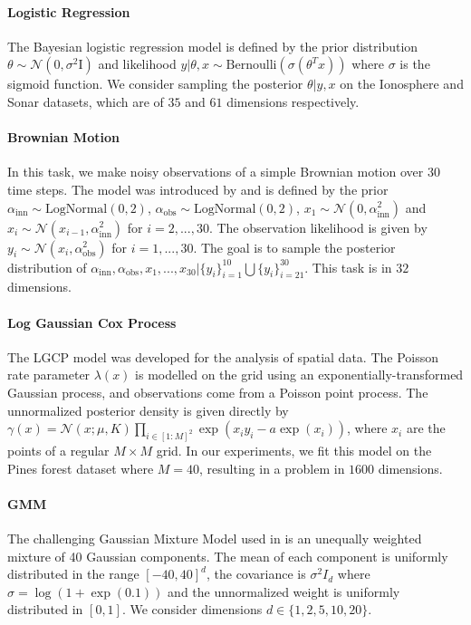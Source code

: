 \documentclass{article}
\theoremstyle{plain}
\theoremstyle{definition}
\theoremstyle{remark}
\begin{document}
\paragraph{Logistic Regression} The Bayesian logistic regression model is defined by the prior distribution $\theta  \sim \mathcal{N}(0, \sigma^2\mathrm{I})$ and likelihood $y|\theta, x \sim \text{Bernoulli}(\sigma(\theta^T x))$ where $\sigma$ is the sigmoid function. We consider sampling the posterior $\theta| y, x$ on the Ionosphere and Sonar datasets, which are of $35$ and $61$ dimensions respectively.

\paragraph{Brownian Motion} In this task, we make noisy observations of a simple Brownian motion over 30 time steps. The model was introduced by \citet{inferencegym2020} and is defined by the prior \(\alpha_{\text{inn}} \sim \text{LogNormal}(0, 2)\), $\alpha_{\text{obs}} \sim \text{LogNormal}(0, 2)$, $x_1 \sim \mathcal{N}(0, \alpha_{\text{inn}}^2)$ and $x_i \sim \mathcal{N}(x_{i-1}, \alpha_{\text{inn}}^2)$ for $i=2, ..., 30$. The observation likelihood is given by $y_i \sim \mathcal{N}(x_i, \alpha_{\text{obs}}^2)$ for $i=1, ..., 30$. The goal is to sample the posterior distribution of $\alpha_\text{inn}, \alpha_{\text{obs}}, x_1, ..., x_{30} | \{y_i\}_{i=1}^{10} \bigcup \{y_i\}_{i=21}^{30}$. This task is in $32$ dimensions.

\paragraph{Log Gaussian Cox Process} The LGCP model \cite{Moller:1998} was developed for the analysis of spatial data. The Poisson rate parameter $\lambda(x)$ is modelled on the grid using an exponentially-transformed Gaussian process, and observations come from a Poisson point process. The unnormalized posterior density is given directly by $\gamma(x) = \mathcal{N}(x; \mu, K)\prod_{i \in [1:M]^2} \exp(x_i y_i - a \exp(x_i))$, where $x_i$ are the points of a regular $M\times M$ grid. In our experiments, we fit this model on the Pines forest dataset where $M=40$, resulting in a problem in $1600$ dimensions.

\paragraph{GMM} The challenging Gaussian Mixture Model used in \cite{midgley2022flow} is an unequally weighted mixture of 40 Gaussian components. The mean of each component is uniformly distributed in the range $[-40,40]^d$, the covariance is $\sigma^2 I_d$ where $\sigma = \log(1+\exp(0.1))$ and the unnormalized weight is uniformly distributed in $[0,1]$. We consider dimensions $d \in \{1,2,5,10,20\}$.
\end{document}
